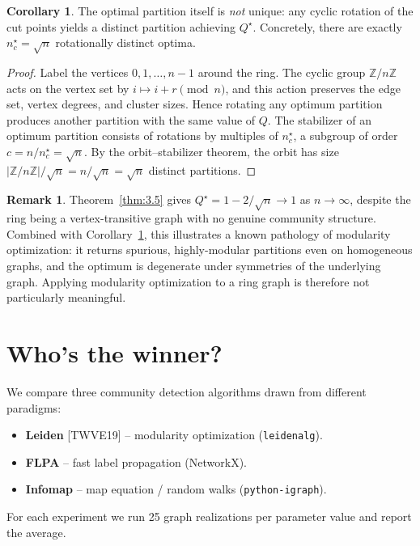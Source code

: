 \documentclass[12pt]{article}
\theoremstyle{definition}
\newtheorem{corollary}[theorem]{Corollary}
\newtheorem{remark}[theorem]{Remark}
\begin{document}
\begin{corollary}
  \label{cor:3.6}
  The optimal partition itself is \emph{not} unique: any cyclic rotation of the cut points yields a distinct partition achieving $Q^{\star}$. Concretely, there are exactly $n_c^{\star} = \sqrt{n}$ rotationally distinct optima.
\end{corollary}

\begin{proof}
  Label the vertices $0, 1, \ldots, n-1$ around the ring. The cyclic group $\mathbb{Z}/n\mathbb{Z}$ acts on the vertex set by $i \mapsto i + r \pmod{n}$, and this action preserves the edge set, vertex degrees, and cluster sizes. Hence rotating any optimum partition produces another partition with the same value of $Q$. The stabilizer of an optimum partition consists of rotations by multiples of $n_c^{\star}$, a subgroup of order $c = n / n_c^{\star} = \sqrt{n}$. By the orbit--stabilizer theorem, the orbit has size $|\mathbb{Z}/n\mathbb{Z}| / \sqrt{n} = n / \sqrt{n} = \sqrt{n}$ distinct partitions.
\end{proof}

\begin{remark}
  Theorem~\ref{thm:3.5} gives $Q^{\star} = 1 - 2/\sqrt{n} \to 1$ as $n \to \infty$, despite the ring being a vertex-transitive graph with no genuine community structure. Combined with Corollary~\ref{cor:3.6}, this illustrates a known pathology of modularity optimization: it returns spurious, highly-modular partitions even on homogeneous graphs, and the optimum is degenerate under symmetries of the underlying graph. Applying modularity optimization to a ring graph is therefore not particularly meaningful.
\end{remark}

\newpage
\section{Who's the winner?}

We compare three community detection algorithms drawn from different paradigms:
\begin{itemize}
  \item \textbf{Leiden} [TWVE19] -- modularity optimization (\texttt{leidenalg}).
  \item \textbf{FLPA} -- fast label propagation (NetworkX).
  \item \textbf{Infomap} -- map equation / random walks (\texttt{python-igraph}).
\end{itemize}
For each experiment we run 25 graph realizations per parameter value and report the average.
\end{document}
